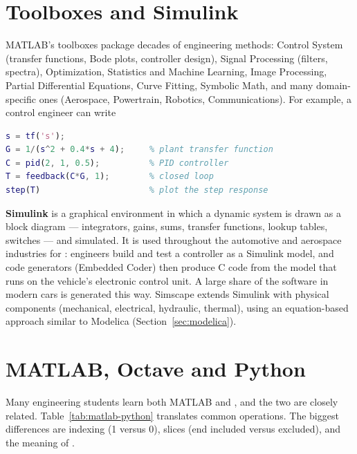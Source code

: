\section{Toolboxes and Simulink}

MATLAB's toolboxes package decades of engineering methods: Control System (transfer
functions, Bode plots, controller design), Signal Processing (filters, spectra),
Optimization, Statistics and Machine Learning, Image Processing, Partial Differential
Equations, Curve Fitting, Symbolic Math, and many domain-specific ones (Aerospace,
Powertrain, Robotics, Communications). For example, a control engineer can write
\begin{lstlisting}[language=Matlab]
s = tf('s');
G = 1/(s^2 + 0.4*s + 4);     % plant transfer function
C = pid(2, 1, 0.5);          % PID controller
T = feedback(C*G, 1);        % closed loop
step(T)                      % plot the step response
\end{lstlisting}

\textbf{Simulink} is a graphical environment in which a dynamic system is drawn as a block
diagram --- integrators, gains, sums, transfer functions, lookup tables, switches --- and
simulated. It is used throughout the automotive and aerospace industries for
: engineers build and test a controller as a Simulink model, and
code generators (Embedded Coder) then produce C code from the model that runs on the
vehicle's electronic control unit. A large share of the software in modern cars is
generated this way. Simscape extends Simulink with physical components (mechanical,
electrical, hydraulic, thermal), using an equation-based approach similar to Modelica
(Section~\ref{sec:modelica}).

\section{MATLAB, Octave and Python}

Many engineering students learn both MATLAB and \py, and the two are closely related.
Table~\ref{tab:matlab-python} translates common operations. The biggest differences are
indexing (1 versus 0), slices (end included versus excluded), and the meaning of
\code{*}.

